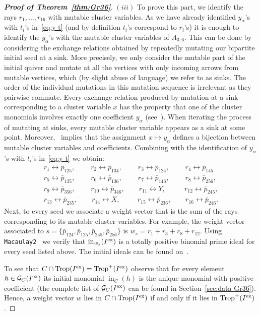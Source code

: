 \documentclass[pdftex]{sigma}%
\numberwithin{equation}{section}
\DeclareMathOperator{\init}{in}
\DeclareMathOperator{\trop}{Trop}
\begin{document}
\begin{proof}[{\bf Proof of Theorem~\ref{thm:Gr36}}]
$(iii)$ To prove this part, we identify the rays $r_1,\dots,r_{16}$ with mutable cluster variables.
 As we have already identified $y_\alpha$'s with $t_i$'s in~\eqref{eq:y-t} (and by definition $t_i$'s correspond to $r_i$'s) it is enough to identify the $y_\alpha$'s with the mutable cluster variables of $A_{3,6}$.
 This can be done by considering the exchange relations obtained by repeatedly mutating our bipartite initial seed at a sink.
 More precisely, we only consider the mutable part of the initial quiver and mutate at all the vertices with only incoming arrows from mutable vertices, which (by slight abuse of language) we refer to as sinks.
 The order of the individual mutations in this mutation sequence is irrelevant as they pairwise commute.
 Every exchange relation produced by mutation at a sink corresponding to a cluster variable $x$ has the property that one of the cluster monomials involves exactly one coefficient $y_{\alpha}$ (see~\cite[Lemma~12.7]{FZ_clustersIV}).
 When iterating the process of mutating at sinks, every mutable cluster variable appears as a sink at some point.
 Moreover,~\cite[Lemma~12.8]{FZ_clustersIV} implies that the assignment $x \mapsto y_\alpha$ defines a bijection between mutable cluster variables and coefficients.
 Combining with the identification of $y_\alpha$'s with $t_i$'s in~\eqref{eq:y-t} we obtain:
\begin{gather*}
r_{1} \leftrightarrow \bar p_{125}, \qquad\ r_{2} \leftrightarrow \bar p_{134},\ \qquad r_{3} \leftrightarrow \bar p_{124},\ \qquad r_{4} \leftrightarrow \bar p_{145}
\\
r_{5} \leftrightarrow \bar p_{135}, \qquad\ r_{6} \leftrightarrow \bar p_{136},\ \qquad r_{7} \leftrightarrow \bar p_{146},\ \qquad r_{8} \leftrightarrow \bar p_{256},
\\
r_{9} \leftrightarrow \bar p_{356}, \qquad\ r_{10} \leftrightarrow \bar p_{346}, \qquad r_{11} \leftrightarrow Y, \ \ \ \qquad r_{12} \leftrightarrow \bar p_{245},
\\
r_{13} \leftrightarrow \bar p_{235},\qquad r_{14} \leftrightarrow X, \ \ \qquad r_{15} \leftrightarrow \bar p_{236}, \qquad r_{16} \leftrightarrow \bar p_{246}.
\end{gather*}
Next, to every seed we associate a weight vector that is the sum of the rays corresponding to its mutable cluster variables.
For example, the weight vector associated to $s=\{\bar p_{124},\bar p_{125},\bar p_{245},\bar p_{256}\}$ is $w_s=r_1+r_3+r_8+r_{12}$.
Using \texttt{Macaulay2}~\cite{M2} we verify that $\init_{w_s}(I^{\rm ex})$ is a totally positive binomial prime ideal for every seed listed above.
The initial ideals can be found on~\cite{homepage}.

To see that $C\cap \trop(I^{\rm ex})=\trop^+(I^{\rm ex})$ observe that for every element $h\in \mathcal G_C(I^{\rm ex})$ its initial monomial $\init_C(h)$ is the unique monomial with positive coefficient (the complete list of $\mathcal G_C(I^{\rm ex})$ can be found in Section~\ref{sec:data Gr36}).
Hence, a weight vector $w$ lies in $C\cap \trop(I^{\rm ex})$ if and only if it lies in $\trop^+(I^{\rm ex})$.
\end{proof}
\end{document}
